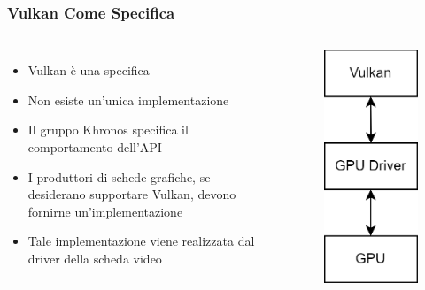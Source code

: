 \begin{frame}
\frametitle{Vulkan Come Specifica}
\begin{columns}


\begin{itemize}
\item Vulkan è una specifica
\item Non esiste un'unica implementazione
\item Il gruppo Khronos specifica il comportamento dell'API
\item I produttori di schede grafiche, se desiderano supportare Vulkan, devono fornirne un'implementazione
\item Tale implementazione viene realizzata dal driver della scheda video
\end{itemize}


\begin{figure}[ht]
    \centering
    \includegraphics[scale=0.2]{images/SlidesVulkan/VulkanSpecification.png}
\end{figure}

\end{columns}
\end{frame}
